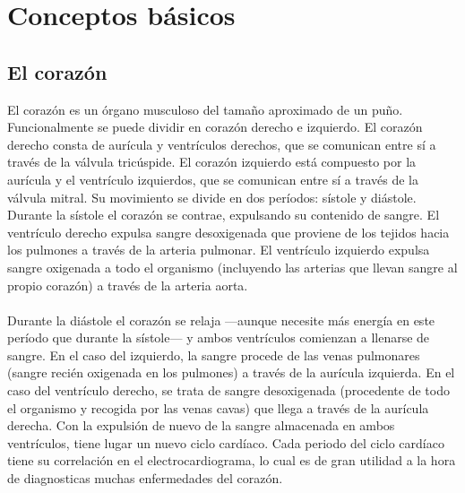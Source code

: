 \documentclass[spanish,11pt,letterpaper,oneside]{memoir}
\begin{document}
\section{Conceptos básicos}

\subsection{El corazón}
	El corazón es un órgano musculoso del tamaño aproximado de un puño. Funcionalmente se puede dividir en corazón derecho e izquierdo. El corazón derecho consta de aurícula y ventrículos derechos, que se comunican entre sí a través de la válvula tricúspide. El corazón izquierdo está compuesto por la aurícula y el ventrículo izquierdos, que se comunican entre sí a través de la válvula mitral. Su movimiento se divide en dos períodos: sístole y diástole. Durante la sístole el corazón se contrae, expulsando su contenido de sangre. El ventrículo derecho expulsa sangre desoxigenada que proviene de los tejidos hacia los pulmones a través de la arteria pulmonar. El ventrículo izquierdo expulsa sangre oxigenada a todo el organismo (incluyendo las arterias que llevan sangre al propio corazón) a través de la arteria aorta. \\
	\\
	Durante la diástole el corazón se relaja ---aunque necesite más energía en este período que durante la sístole--- y ambos ventrículos comienzan a llenarse de sangre. En el caso del izquierdo, la sangre procede de las venas pulmonares (sangre recién oxigenada en los pulmones) a través de la aurícula izquierda. En el caso del ventrículo derecho, se trata de sangre desoxigenada (procedente de todo el organismo y recogida por las venas cavas) que llega a través de la aurícula derecha. Con la expulsión de nuevo de la sangre almacenada en ambos ventrículos, tiene lugar un nuevo ciclo cardíaco. Cada periodo del ciclo cardíaco tiene su correlación en el electrocardiograma, lo cual es de gran utilidad a la hora de diagnosticas muchas enfermedades del corazón.\cite{fbbva}
\end{document}
